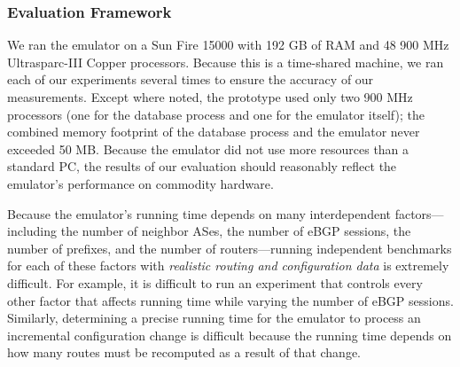 \subsubsection{Evaluation Framework}

We ran the emulator on a Sun Fire 15000 with 192 GB of RAM and 48
900 MHz Ultrasparc-III Copper processors.  Because this is a time-shared
machine, we ran each of our experiments several times to ensure the
accuracy of our measurements.  Except where noted, the prototype used
only two 900 MHz processors (one for the database process and one for
the emulator itself); the combined memory footprint of the
database process and the emulator never exceeded 50 MB.  Because the
emulator did not use more resources than a standard PC, the results of
our evaluation should reasonably reflect the emulator's
performance on commodity hardware.


Because the emulator's running time depends on many interdependent
factors---including the number of neighbor ASes, the number of eBGP
sessions, the number of prefixes, and the number of routers---running
independent benchmarks for each of these factors with {\em realistic
routing and configuration data} is extremely difficult.  For example, it
is difficult to run an experiment that controls every other factor that
affects running time while varying the number of eBGP sessions.
Similarly, determining a precise running time for the emulator to
process an incremental configuration change is difficult because the
running time depends on how many routes must be recomputed as a result
of that change.

